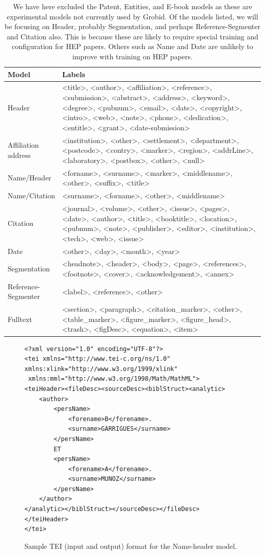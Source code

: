 \documentclass[11pt, oneside]{scrartcl}   	%
\begin{document}
\begin{center}
\begin{table}
\begin{tabular}{ | p{0.2\linewidth} | p{0.8\linewidth} |}
	\hline
	Model & Labels \\ \hline
    	Header & <title>, <author>, <affiliation>, <reference>, <submission>, <abstract>, <address>, <keyword>, <degree>, <pubnum>, <email>, <date>, <copyright>, <intro>, <web>, <note>, <phone>, <dedication>, <entitle>, <grant>, <date-submission> \\ \hline
	Affiliation address & <institution>, <other>, <settlement>, <department>, <postcode>, <contry>, <marker>, <region>, <addrLine>, <laboratory>, <postbox>, <other>, <null> \\ \hline
	Name/Header & <forname>, <surname>, <marker>, <middlename>, <other>, <suffix>, <title> \\ \hline
	Name/Citation & <surname>, <forname>, <other>, <middlename> \\ \hline
	Citation & <journal>, <volume>, <other>, <issue>, <pages>, <date>, <author>, <title>, <booktitle>, <location>, <pubnum>, <note>, <publisher>, <editor>, <institution>, <tech>, <web>, <issue> \\ \hline
	Date & <other>, <day>, <month>, <year> \\ \hline
	Segmentation & <headnote>, <header>, <body>, <page>, <references>, <footnote>, <cover>, <acknowledgement>, <annex> \\ \hline
	Reference-Segmenter & <label>, <reference>, <other> \\ \hline
	Fulltext & <section>, <paragraph>, <citation\_marker>, <other>, <table\_marker>, <figure\_marker>, <figure\_head>, <trash>, <figDesc>, <equation>, <item> \\ \hline
\end{tabular}
\caption{We have here excluded the Patent, Entities, and E-book models as these are experimental models not currently used by Grobid. Of the models listed, we will be focusing on Header, probably Segmentation, and perhaps Reference-Segmenter and Citation also. This is because these are likely to require special training and configuration for HEP papers. Others such as Name and Date are unlikely to improve with training on HEP papers.}
\label{fig:featurelist}
\end{table}
\end{center}

\begin{figure}
\begin{verbatim}
<?xml version="1.0" encoding="UTF-8"?>
<tei xmlns="http://www.tei-c.org/ns/1.0" xmlns:xlink="http://www.w3.org/1999/xlink"
 xmlns:mml="http://www.w3.org/1998/Math/MathML">
<teiHeader><fileDesc><sourceDesc><biblStruct><analytic>
	<author>
		<persName>
			<forename>B</forename>.
			<surname>GARRIGUES</surname>
		</persName>
		ET
		<persName>
			<forename>A</forename>.
			<surname>MUNOZ</surname>
		</persName>
	</author>
</analytic></biblStruct></sourceDesc></fileDesc></teiHeader>
</tei>
\end{verbatim}
\caption{Sample TEI (input and output) format for the Name-header model.}
\label{fig:traininput}
\end{figure}
\end{document}
